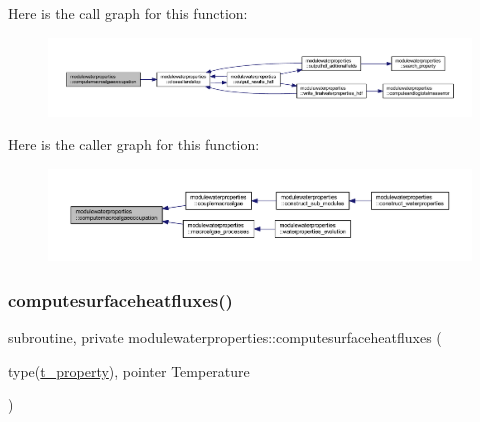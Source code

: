 Here is the call graph for this function\+:\nopagebreak
\begin{figure}[H]
\begin{center}
\leavevmode
\includegraphics[width=350pt]{namespacemodulewaterproperties_a196db184712b743908b747b05495bc60_cgraph}
\end{center}
\end{figure}
Here is the caller graph for this function\+:\nopagebreak
\begin{figure}[H]
\begin{center}
\leavevmode
\includegraphics[width=350pt]{namespacemodulewaterproperties_a196db184712b743908b747b05495bc60_icgraph}
\end{center}
\end{figure}
\mbox{\label{namespacemodulewaterproperties_a772748e5406dcfadf1087f66a9622a83}} 
\subsubsection{\texorpdfstring{computesurfaceheatfluxes()}{computesurfaceheatfluxes()}}
{\footnotesize\ttfamily subroutine, private modulewaterproperties\+::computesurfaceheatfluxes (\begin{DoxyParamCaption}\item[{type(\mbox{\hyperlink{structmodulewaterproperties_1_1t__property}{t\+\_\+property}}), pointer}]{Temperature }\end{DoxyParamCaption})\hspace{0.3cm}{\ttfamily [private]}}

